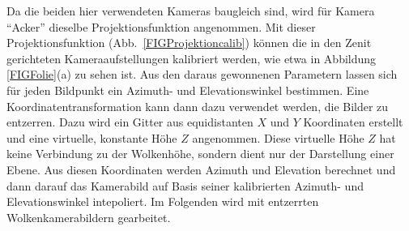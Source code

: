\documentclass[a4paper,11pt,twoside,german]{article}
\newcommand{\absatz}{\smallbreak}
\begin{document}
Da die beiden hier verwendeten Kameras baugleich sind, wird für Kamera
\enquote{Acker} dieselbe Projektionsfunktion angenommen.  Mit dieser
Projektionsfunktion (Abb.~\ref{FIGProjektioncalib}) können die in den
Zenit gerichteten Kameraaufstellungen kalibriert werden, wie etwa in Abbildung
\ref{FIGFolie}(a) zu sehen ist. Aus den daraus gewonnenen Parametern lassen sich für jeden Bildpunkt ein Azimuth- und Elevationswinkel bestimmen. 
\absatz 
Eine Koordinatentransformation kann dann dazu verwendet werden, die
Bilder zu entzerren. Dazu wird ein Gitter aus equidistanten $X$ und $Y$
Koordinaten erstellt und eine virtuelle, konstante Höhe $Z$ angenommen. Diese
virtuelle Höhe $Z$ hat keine Verbindung zu der Wolkenhöhe, sondern dient nur der
Darstellung einer Ebene. Aus diesen Koordinaten werden Azimuth und Elevation
berechnet und dann darauf das Kamerabild auf Basis seiner kalibrierten Azimuth-
und Elevationswinkel intepoliert.
Im Folgenden wird mit entzerrten Wolkenkamerabildern gearbeitet.
\end{document}
